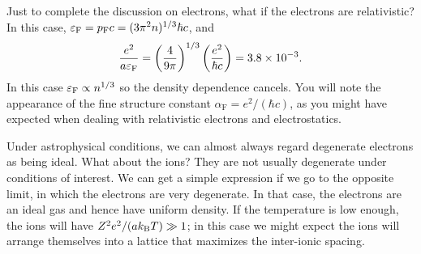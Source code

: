 Just to complete the discussion on electrons, what if the electrons are relativistic?  In this case, $\varepsilon_{\mathrm{F}} = p_{\mathrm{F}} c = (3\pi^{2}n)^{1/3}\hbar c$, and
\begin{equation}\label{e.condition-weak-rel-degen}
\frac{e^{2}}{a \varepsilon_{\mathrm{F}}} = \left(\frac{4}{9\pi}\right)^{1/3}\left(\frac{e^{2}}{\hbar c}\right) = 3.8\times 10^{-3}.
\end{equation}
In this case $\varepsilon_{\mathrm{F}} \propto n^{1/3}$ so the density dependence cancels.  You will note the appearance of the fine structure constant $\alpha_{\mathrm{F}} = e^{2}/(\hbar c)$, as you might have expected when dealing with relativistic electrons and electrostatics.

Under astrophysical conditions, we can almost always regard degenerate electrons as being ideal.  What about the ions?  They are not usually degenerate under conditions of interest. We can get a simple expression if we go to the opposite limit, in which the electrons are very degenerate.  In that case, the electrons are an ideal gas and hence have uniform density. If the temperature is low enough, the ions will have $Z^{2}e^{2}/(ak_\mathrm{B} T) \gg 1$; in this case we might expect the ions will arrange themselves into a lattice that maximizes the inter-ionic spacing.

